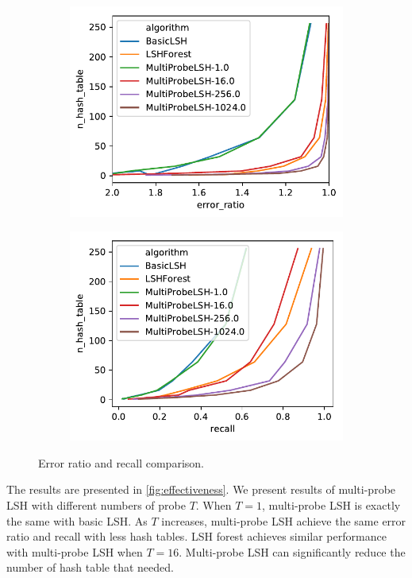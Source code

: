 \begin{figure}[hbt]
\label{fig:effectiveness}
\begin{subfigure}{\columnwidth}
  \includegraphics[width=\columnwidth]{figures/error_ratio}
\end{subfigure}
\begin{subfigure}{\columnwidth}
  \includegraphics[width=\columnwidth]{figures/recall}
\end{subfigure}
\caption{Error ratio and recall comparison.}
\end{figure}

The results are presented in \cref{fig:effectiveness}.
We present results of multi-probe LSH with different numbers of probe $T$.
When $T=1$, multi-probe LSH is exactly the same with basic LSH.
As $T$ increases, multi-probe LSH achieve the same error ratio and recall with less hash tables.
LSH forest achieves similar performance with multi-probe LSH when $T=16$.
Multi-probe LSH can significantly reduce the number of hash table that needed.


